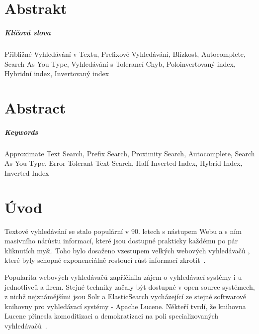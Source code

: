 \documentclass[11pt,letterpaper,oneside,openright]{book}
\begin{document}
\newpage
\chapter*{Abstrakt}
\paragraph{Klíčová slova}
Přibližné Vyhledávání v Textu, Prefixové Vyhledávání, Blízkost, Autocomplete, Search As You Type, Vyhledávání s Tolerancí Chyb, Poloinvertovaný index, Hybridní index, Invertovaný index

\newpage
\chapter*{Abstract}
\paragraph{Keywords}
Approximate Text Search, Prefix Search, Proximity Search, Autocomplete, Search As You Type, Error Tolerant Text Search, Half-Inverted Index, Hybrid Index, Inverted Index


\newpage
{\hypersetup{hidelinks}
    \tableofcontents
}

\mainmatter
\chapter{Úvod}
Textové vyhledávání se stalo populární v 90. letech s nástupem Webu a s ním
masivního nárůstu informací, které jsou dostupné prakticky každému po pár
kliknutích myši. Toho bylo dosaženo vzestupem velkých webových vyhledávačů ,
které byly schopné exponenciálně rostoucí růst informací
zkrotit~\cite{search_history}.


Popularita webových vyhledávačů zapříčinila zájem o vyhledávací systémy i u
jednotlivců a firem. Stejné techniky začaly být dostupné v open source
systémech, z nichž nejznámějšími jsou Solr a ElasticSearch vycházející ze
stejné softwarové knihovny pro vyhledávací systémy - Apache Lucene. Někteří
tvrdí, že knihovna Lucene přinesla komoditizaci a demokratizaci na poli
specializovaných vyhledávačů~\cite{dion_almaer,javaworld}.
\end{document}
